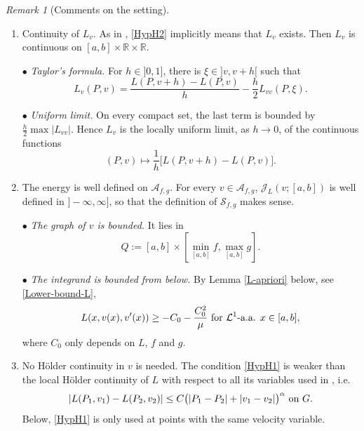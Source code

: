\documentclass[reqno,12pt]{amsart}
\numberwithin{equation}{section}
\def\RR{{\mathds R}}
\def\J{\mathcal{J}_L}
\def\A{\mathcal{A}_{f,g}}
\def\Sol{\mathcal{S}_{f,g}}
\theoremstyle{remark}
\newtheorem{remark}[theorem]{Remark}
\begin{document}
\begin{remark}[Comments on the setting]\label{Remark-Lv-continuous}
\begin{enumerate}[leftmargin=2em, itemsep=1em, topsep=0.6em]
\item[(a)] {\sf Continuity of $L_v$.} As in \cite{mandallena18}, \ref{HypH2} implicitly means that $L_v$ exists. Then $L_v$ is continuous on $[a,b]\times\RR\times\RR$.

$\scriptstyle\bullet$ {\em Taylor's formula.} For $h\in]0,1]$, there is $\xi\in]v,v+h[$ such that
\begin{equation*}
L_v(P,v)=\frac{L(P,v+h)-L(P,v)}{h}-\frac h2L_{vv}(P,\xi).
\end{equation*}

$\scriptstyle\bullet$ {\em Uniform limit.} On every compact set, the last term is bounded by $\frac h2\max|L_{vv}|$. Hence $L_v$ is the locally uniform limit, as $h\to0$, of the continuous functions
\begin{equation*}
(P,v)\longmapsto\frac1h\big[L(P,v+h)-L(P,v)\big].
\end{equation*}

\item[(b)] {\sf The energy is well defined on $\A$.} For every $v\in\A$, $\J(v;[a,b])$ is well defined in $]-\infty,\infty]$, so that the definition of $\Sol$ makes sense.

$\scriptstyle\bullet$ {\em The graph of $v$ is bounded.} It lies in
\begin{equation*}
Q:=[a,b]\times\left[\min_{[a,b]}f,\max_{[a,b]}g\right].
\end{equation*}

$\scriptstyle\bullet$ {\em The integrand is bounded from below.} By Lemma \ref{L-apriori} below, see \eqref{Lower-bound-L},
\begin{equation*}
L(x,v(x),v^\prime(x))\geq-C_0-\frac{C_0^2}{\mu}\hbox{ for }\mathcal{L}^1\hbox{-a.a. }x\in[a,b],
\end{equation*}
where $C_0$ only depends on $L$, $f$ and $g$.

\item[(c)] {\sf No H\"older continuity in $v$ is needed.} The condition \ref{HypH1} is weaker than the local H\"older continuity of $L$ with respect to all its variables used in \cite{mandallena18}, i.e.
\begin{equation*}
|L(P_1,v_1)-L(P_2,v_2)|\leq C\big(|P_1-P_2|+|v_1-v_2|\big)^\alpha\hbox{ on }G.
\end{equation*}
Below, \ref{HypH1} is only used at points with the same velocity variable.
\end{enumerate}
\end{remark}
\end{document}
